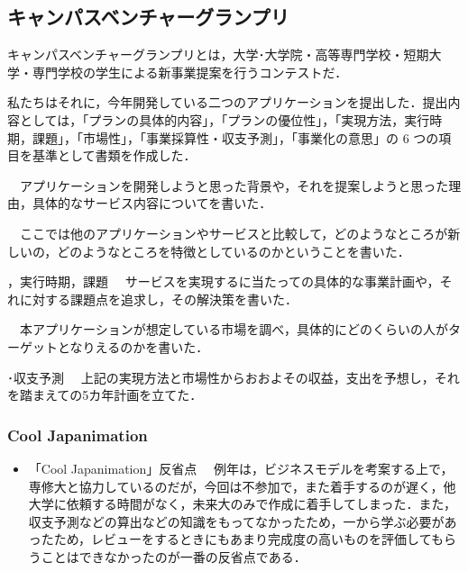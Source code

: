 \subsection{キャンパスベンチャーグランプリ}
\par
キャンパスベンチャーグランプリとは，大学･大学院・高等専門学校・短期大学・専門学校の学生による新事業提案を行うコンテストだ．
\par
私たちはそれに，今年開発している二つのアプリケーションを提出した．提出内容としては，「プランの具体的内容」，「プランの優位性」，「実現方法，実行時期，課題」，「市場性」，「事業採算性・収支予測」，「事業化の意思」の 6 つの項目を基準として書類を作成した．
\par
\begin{enumerate}
　アプリケーションを開発しようと思った背景や，それを提案しようと思った理由，具体的なサービス内容についてを書いた．
\par
{}
　ここでは他のアプリケーションやサービスと比較して，どのようなところが新しいの，どのようなところを特徴としているのかということを書いた．
\par
{}，実行時期，課題
　サービスを実現するに当たっての具体的な事業計画や，それに対する課題点を追求し，その解決策を書いた．
\par
{}
　本アプリケーションが想定している市場を調べ，具体的にどのくらいの人がターゲットとなりえるのかを書いた．
\par
{}･収支予測
　上記の実現方法と市場性からおおよその収益，支出を予想し，それを踏まえての5カ年計画を立てた．
\end{enumerate}
\par
\subsubsection{Cool Japanimation}
\par
\begin{itemize}
　9月26日から10月31日の期間で提出するための書類作成を行なった．今回は未来大のみで書類作成を行なった．アプリケーションでどのような利益を得るか，またそのモデルからどれくらいの規模の利益を得られるか，アプリケーションを企業として運営した場合の人件費などについて考えた．収支予測を考えるに至って，未来大では知識不足だったので，作成に大いに手間取ってしまった．また，一次審査を通過することはなかった．
\par
\item「Cool Japanimation」反省点
　例年は，ビジネスモデルを考案する上で，専修大と協力しているのだが，今回は不参加で，また着手するのが遅く，他大学に依頼する時間がなく，未来大のみで作成に着手してしまった．また，収支予測などの算出などの知識をもってなかったため，一から学ぶ必要があったため，レビューをするときにもあまり完成度の高いものを評価してもらうことはできなかったのが一番の反省点である．
\end{itemize}

